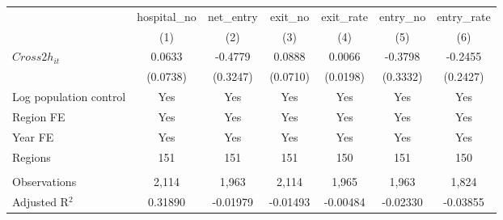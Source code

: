 \begingroup
\centering
\begin{tabular}{lcccccc}
   \toprule
                          & hospital\_no  & net\_entry  & exit\_no  & exit\_rate  & entry\_no  & entry\_rate \\    
                          & (1)           & (2)         & (3)       & (4)         & (5)        & (6)\\  
   \midrule 
   $Cross2h_{it}$         & 0.0633        & -0.4779     & 0.0888    & 0.0066      & -0.3798    & -0.2455\\   
                          & (0.0738)      & (0.3247)    & (0.0710)  & (0.0198)    & (0.3332)   & (0.2427)\\   
   Log population control & Yes           & Yes         & Yes       & Yes         & Yes        & Yes\\  
   Region FE              & Yes           & Yes         & Yes       & Yes         & Yes        & Yes\\  
   Year FE                & Yes           & Yes         & Yes       & Yes         & Yes        & Yes\\  
   Regions                & 151           & 151         & 151       & 150         & 151        & 150\\  
    \\
   Observations           & 2,114         & 1,963       & 2,114     & 1,965       & 1,963      & 1,824\\  
   Adjusted R$^2$         & 0.31890       & -0.01979    & -0.01493  & -0.00484    & -0.02330   & -0.03855\\  
   \bottomrule
\end{tabular}
\par\endgroup
